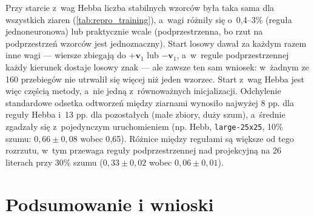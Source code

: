 \documentclass[11pt,a4paper]{article}
\newcommand{\vv}{\mathbf{v}}
\begin{document}
Przy starcie z~wag Hebba liczba stabilnych wzorców była taka sama dla wszystkich ziaren
(\cref{tab:repro_training}), a~wagi różniły się o~0{,}4--3\% (reguła jednoneuronowa) lub
praktycznie wcale (podprzestrzenna, bo rzut na podprzestrzeń wzorców jest jednoznaczny). Start
losowy dawał za każdym razem inne wagi --- wiersze zbiegają do $+\vv_1$ lub $-\vv_1$, a~w~regule
podprzestrzennej każdy kierunek dostaje losowy znak --- ale zawsze ten sam wniosek: w~żadnym ze
160 przebiegów nie utrwalił się więcej niż jeden wzorzec. Start z~wag Hebba jest więc częścią
metody, a~nie jedną z~równoważnych inicjalizacji. Odchylenie standardowe odsetka odtworzeń między
ziarnami wynosiło najwyżej 8 pp. dla reguły Hebba i~13 pp. dla pozostałych (małe zbiory, duży
szum), a~średnie zgadzały się z~pojedynczym uruchomieniem (np. Hebb, \texttt{large-25x25},
10\% szumu: $0{,}66\pm0{,}08$ wobec 0{,}65). Różnice między regułami są większe od tego
rozrzutu, w~tym przewaga reguły podprzestrzennej nad projekcyjną na 26 literach przy 30\% szumu
($0{,}33\pm0{,}02$ wobec $0{,}06\pm0{,}01$).

\section{Podsumowanie i wnioski}
\end{document}
